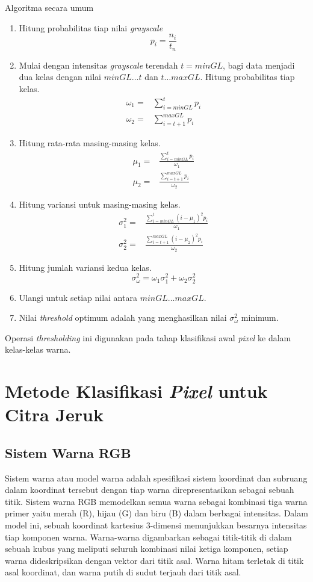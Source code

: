 \documentclass[laporan.tex]{subfiles}
\begin{document}
Algoritma secara umum
\begin{enumerate}
\item Hitung probabilitas tiap nilai \emph{grayscale}
\begin{equation}
	p_i = \frac{n_i}{t_n}
\end{equation}
\item Mulai dengan intensitas \emph{grayscale} terendah $t=minGL$, bagi data menjadi dua kelas dengan nilai $minGL \ldots t$ dan $t \ldots maxGL$. Hitung probabilitas tiap kelas.
\begin{align}
	\omega_1 = & \sum_{i=minGL}^t p_i \\
	\omega_2 = & \sum_{i=t+1}^{maxGL} p_i
\end{align}
\item Hitung rata-rata masing-masing kelas.
\begin{align}
	\mu_1 = & \frac{\sum_{i=minGL}^t p_i}{\omega_1} \\
	\mu_2 = & \frac{\sum_{i=t+1}^{maxGL} p_i}{\omega_2}
\end{align}
\item Hitung variansi untuk masing-masing kelas.
\begin{align}
	\sigma_1^2 = & \frac{\sum_{i=minGL}^t (i - \mu_1)^2 p_i}{\omega_1} \\
	\sigma_2^2 = & \frac{\sum_{i=t+1}^{maxGL} (i - \mu_2)^2 p_i}{\omega_2}
\end{align}
\item Hitung jumlah variansi kedua kelas.
\begin{equation}
	\sigma_{\omega}^2 = \omega_1 \sigma_1^2 + \omega_2 \sigma_2^2
\end{equation}
\item Ulangi untuk setiap nilai antara $minGL \ldots maxGL$.
\item Nilai \emph{threshold} optimum adalah yang menghasilkan nilai $\sigma_{\omega}^2$ minimum.
\end{enumerate}

Operasi \emph{thresholding} ini digunakan pada tahap klasifikasi awal \emph{pixel} ke dalam kelas-kelas warna.

\section{Metode Klasifikasi \emph{Pixel} untuk Citra Jeruk}

\subsection{Sistem Warna RGB}
Sistem warna atau model warna adalah spesifikasi sistem koordinat dan subruang dalam koordinat tersebut dengan tiap warna direpresentasikan sebagai sebuah titik. Sistem warna RGB memodelkan semua warna sebagai kombinasi tiga warna primer yaitu merah (R), hijau (G) dan biru (B) dalam berbagai intensitas. Dalam model ini, sebuah koordinat kartesius 3-dimensi menunjukkan besarnya intensitas tiap komponen warna. Warna-warna digambarkan sebagai titik-titik di dalam sebuah kubus yang meliputi seluruh kombinasi nilai ketiga komponen, setiap warna dideskripsikan dengan vektor dari titik asal. Warna hitam terletak di titik asal koordinat, dan warna putih di sudut terjauh dari titik asal.
\end{document}
